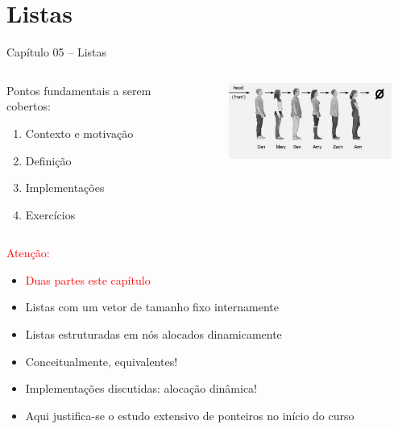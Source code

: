 
\section{Listas}

\begin{frame}

\begin{center}
{\Large Capítulo 05 -- Listas}
\end{center}

\begin{columns}
\begin{column}{.5\textwidth}
\centering
Pontos fundamentais a serem cobertos:
  \begin{enumerate}
  \item Contexto e motivação
  \item Definição
  \item Implementações
  \item Exercícios 
\end{enumerate}  

\end{column}
\begin{column}{.5\textwidth}
\centering
\includegraphics[height=2.5cm, width=7cm]{figs/fig_listas/ilustra_lista.jpg}
\end{column}
\end{columns}


\end{frame}
\begin{frame}

\begin{block}{ \textcolor{red}{Atenção:} }

\begin{itemize}
  \item \textcolor{red}{Duas partes este capítulo}
  \item   Listas com um vetor de tamanho fixo internamente
  \item  Listas estruturadas em nós alocados dinamicamente
  \item  Conceitualmente, equivalentes!
  \item  Implementações discutidas: alocação dinâmica!
  \item  Aqui justifica-se o estudo extensivo de ponteiros no início do curso
\end{itemize}

\end{block}

\end{frame}


